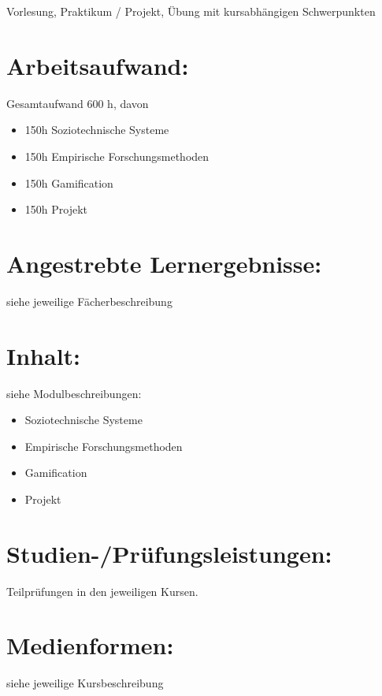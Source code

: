 Vorlesung, Praktikum / Projekt, Übung mit kursabhängigen Schwerpunkten

\section*{Arbeitsaufwand:}\label{arbeitsaufwand-26}

Gesamtaufwand 600 h, davon

\begin{itemize}
\tightlist
\item
  150h Soziotechnische Systeme
\item
  150h Empirische Forschungsmethoden
\item
  150h Gamification
\item
  150h Projekt
\end{itemize}

\section*{Angestrebte
Lernergebnisse:}\label{angestrebte-lernergebnisse-27}

siehe jeweilige Fächerbeschreibung

\section*{Inhalt:}\label{inhalt-27}

siehe Modulbeschreibungen:

\begin{itemize}
\tightlist
\item
  Soziotechnische Systeme
\item
  Empirische Forschungsmethoden
\item
  Gamification
\item
  Projekt
\end{itemize}

\section*{Studien-/Prüfungsleistungen:}\label{studien-pruxfcfungsleistungen-25}

Teilprüfungen in den jeweiligen Kursen.

\section*{Medienformen:}\label{medienformen-18}

siehe jeweilige Kursbeschreibung

